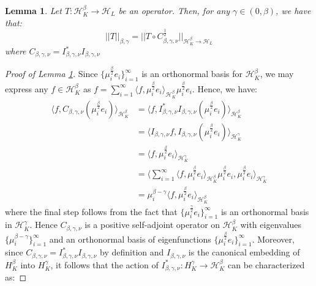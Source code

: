 \documentclass[10pt,a4paper]{amsart}
\newtheorem{lemma}{Lemma}
\begin{document}
\begin{lemma}
\label{Operator Norms in Interpolation Spaces}
Let $T: \mathcal{H}^{\beta}_K \to \mathcal{H}_L$ be an operator. Then, for any $\gamma \in (0, \beta)$, we have that:
\begin{equation*}
    ||T||_{\beta, \gamma} = ||T \circ C_{\beta, \gamma, \nu}^{\frac{1}{2}}||_{\mathcal{H}^{\beta}_K \to \mathcal{H}_L}
\end{equation*}
where $C_{\beta, \gamma, \nu} = I^{*}_{\beta, \gamma, \nu}I_{\beta, \gamma, \nu}$ 
\end{lemma}

\begin{proof}[Proof of Lemma \ref{Operator Norms in Interpolation Spaces}]
Since $\{\mu^{\frac{\beta}{2}}_i e_i\}_{i = 1}^{\infty}$ is an orthonormal basis for $\mathcal{H}^{\beta}_K$, we may express any $f \in \mathcal{H}^{\beta}_{K}$ as $f = \sum_{i = 1}^{\infty} \langle f, \mu^{\frac{\beta}{2}}_i e_i \rangle_{\mathcal{H}^{\beta}_K}\mu^{\frac{\beta}{2}}_i e_i$. Hence, we have:
\begin{align*}
    \langle f, C_{\beta, \gamma, \nu} (\mu^{\frac{\beta}{2}}_i e_i) \rangle_{\mathcal{H}^{\beta}_K} & = \langle f, I^{*}_{\beta, \gamma, \nu}I_{\beta, \gamma, \nu} (\mu^{\frac{\beta}{2}}_i e_i) \rangle_{\mathcal{H}^{\beta}_K} \\
    & = \langle I_{\beta, \gamma, \nu}f, I_{\beta, \gamma, \nu} (\mu^{\frac{\beta}{2}}_i e_i) \rangle_{\mathcal{H}^{\gamma}_K} \\
    & = \langle f, \mu^{\frac{\beta}{2}}_i e_i \rangle_{\mathcal{H}^{\gamma}_K} \\
    & = \Big \langle \sum_{i = 1}^{\infty} \langle f, \mu^{\frac{\beta}{2}}_i e_i \rangle_{\mathcal{H}^{\beta}_K}\mu^{\frac{\beta}{2}}_i e_i, \mu^{\frac{\beta}{2}}_i e_i \Big\rangle_{\mathcal{H}^{\gamma}_K} \\
    & = \mu^{\beta - \gamma}_i \langle f, \mu^{\frac{\beta}{2}}_i e_i \rangle_{\mathcal{H}^{\beta}_K}
\end{align*}
where the final step follows from the fact that $\{\mu_i^{\frac{\gamma}{2}}e_i\}_{i = 1}^{\infty}$ is an orthonormal basis in $\mathcal{H}^{\gamma}_K$. Hence $C_{\beta, \gamma, \nu}$ is a positive self-adjoint operator on $\mathcal{H}^{\beta}_K$ with eigenvalues $\{\mu^{\beta - \gamma}_i\}_{i = 1}^{\infty}$ and an orthonormal basis of eigenfunctions $\{\mu^{\frac{\beta}{2}}_i e_i\}_{i = 1}^{\infty}$. Moreover, since $C_{\beta, \gamma, \nu} = I^{*}_{\beta, \gamma, \nu}I_{\beta, \gamma, \nu}$ by definition and $I_{\beta, \gamma, \nu}$ is the canonical embedding of $H^{\beta}_{K}$ into $H^{\gamma}_{K}$, it follows that the action of $I^{*}_{\beta, \gamma, \nu}: H^{\gamma}_{K} \to  \mathcal{H}^{\beta}_{K}$ can be characterized as:

\end{proof}
\end{document}
